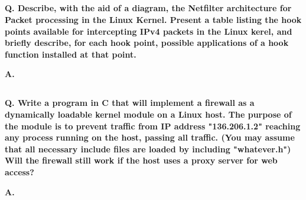 \subsection{}

\textbf{Q. Describe, with the aid of a diagram, the Netfilter architecture for Packet
processing in the Linux Kernel. Present a table listing the hook points
available for intercepting IPv4 packets in the Linux kerel, and briefly
describe, for each hook point, possible applications of a hook function
installed at that point.}

\textbf{A.}

\subsection{}

\textbf{Q. Write a program in C that will implement a firewall as a dynamically loadable
kernel module on a Linux host. The purpose of the module is to prevent traffic
from IP address "136.206.1.2" reaching any process running on the host, passing
all traffic. (You may assume that all necessary include files are loaded by
including "whatever.h") Will the firewall still work if the host uses a proxy
server for web access?}

\textbf{A.}

